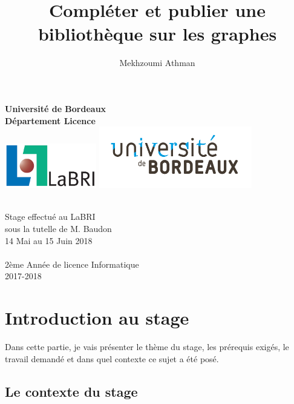 \documentclass[12pt]{report}
\title{Compléter et publier une bibliothèque sur les graphes}
\author{
	Mekhzoumi Athman
	}
\begin{document}
\makeatletter
  \begin{titlepage}
  \centering
      {\large\textbf{Université de Bordeaux\\
       Département Licence}}\\
      \includegraphics[width=0.30\textwidth]{logo_labri_complet_coul.jpg}
      \hfill
      \includegraphics[width=0.50\textwidth]{Universite_Bordeaux_RVB-01.jpg}\\
    \vspace{4cm}
      
       {\LARGE \textbf{\@title}} \\
    \vspace{2cm}
     {\large Stage effectué au LaBRI}\\
      {\large sous la tutelle de M. Baudon}\\
      {\large 14 Mai au 15 Juin 2018}\\
    \vspace{4em}
        {\large \@author} \\
    \vfill
    	{\large 2ème Année de licence Informatique}\\
    	{\large \textsc{2017-2018}}\\
    
    \end{titlepage}


\newpage
\tableofcontents
\newpage
\chapter{Introduction au stage}

Dans cette partie, je vais présenter le thème du stage, les prérequis exigés, le travail demandé et dans quel contexte ce sujet a été posé.

\section{Le contexte du stage}
\end{document}

